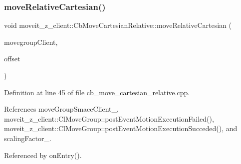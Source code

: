 \subsubsection{\texorpdfstring{move\+Relative\+Cartesian()}{moveRelativeCartesian()}}
{\footnotesize\ttfamily void moveit\+\_\+z\+\_\+client\+::\+Cb\+Move\+Cartesian\+Relative\+::move\+Relative\+Cartesian (\begin{DoxyParamCaption}\item[{moveit\+::planning\+\_\+interface\+::\+Move\+Group\+Interface $\ast$}]{movegroup\+Client,  }\item[{geometry\+\_\+msgs\+::\+Vector3 \&}]{offset }\end{DoxyParamCaption})}



Definition at line 45 of file cb\+\_\+move\+\_\+cartesian\+\_\+relative.\+cpp.



References move\+Group\+Smacc\+Client\+\_\+, moveit\+\_\+z\+\_\+client\+::\+Cl\+Move\+Group\+::post\+Event\+Motion\+Execution\+Failed(), moveit\+\_\+z\+\_\+client\+::\+Cl\+Move\+Group\+::post\+Event\+Motion\+Execution\+Succeded(), and scaling\+Factor\+\_\+.



Referenced by on\+Entry().


